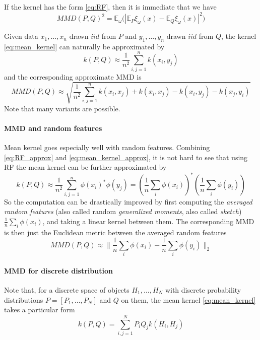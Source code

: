 \documentclass{article}
\begin{document}
If the kernel has the form \eqref{eq:RF}, then it is immediate that we have
\begin{equation}
\label{eq:MMD-RF}
MMD(P,Q)^2 = \mathbb{E}_{\omega} \Big( | \mathbb{E}_P \xi_\omega(x) - \mathbb{E}_Q \xi_\omega(x) |^2 \Big)
\end{equation}

Given data $x_1, \ldots, x_n$ drawn $iid$ from $P$ and $y_1, \ldots, y_n$ drawn $iid$ from $Q$, the kernel \eqref{eq:mean_kernel} can naturally be approximated by
\begin{equation}\label{eq:mean_kernel_approx}
k(P,Q) \approx \frac{1}{n^2} \sum_{i,j=1}^n k(x_i,y_j)
\end{equation}
and the corresponding approximate MMD is
\[
MMD(P,Q) \approx \sqrt{\frac{1}{n^2} \sum_{i,j=1}^n k(x_i,x_j) + k(x_i,x_j) - k(x_i,y_j) - k(x_j, y_i)}
\]
Note that many variants are possible.

\paragraph{MMD and random features} Mean kernel goes especially well with random features. Combining \eqref{eq:RF_approx} and \eqref{eq:mean_kernel_approx}, it is not hard to see that using RF the mean kernel can be further approximated by
\begin{equation}
\label{eq:mean_kernel_RF}
k(P,Q) \approx \frac{1}{n^2} \sum_{i,j=1}^n \phi(x_i)^*\phi(y_j) = \left(\frac{1}{n} \sum_i \phi(x_i)\right)^* \left(\frac{1}{n} \sum_i \phi(y_i)\right)
\end{equation}
So the computation can be drastically improved by first computing the \emph{averaged random features} (also called random \emph{generalized moments}, also called \emph{sketch}) $\frac{1}{n} \sum_i \phi(x_i)$, and taking a linear kernel between them. The corresponding MMD is then just the Euclidean metric between the averaged random features
\[
MMD(P,Q) \approx \| \frac{1}{n} \sum_i \phi(x_i) - \frac{1}{n} \sum_i \phi(y_i)\|_2
\]

\paragraph{MMD for discrete distribution} Note that, for a discrete space of objects $H_1, \ldots, H_N$ with discrete probability distributions $P = [P_1, \ldots, P_N]$ and $Q$ on them, the mean kernel \eqref{eq:mean_kernel} takes a particular form
\[
k(P,Q) = \sum_{i,j=1}^N P_i Q_j k(H_i, H_j)
\]
\end{document}
